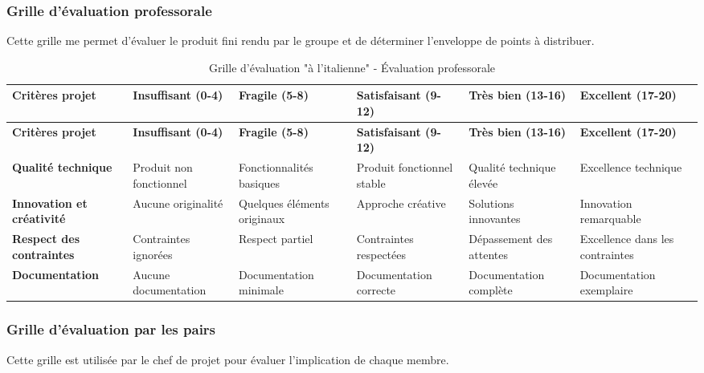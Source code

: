 \subsubsection{Grille d'évaluation professorale}
Cette grille me permet d'évaluer le produit fini rendu par le groupe et de déterminer l'enveloppe de points à distribuer.

\begin{longtable}{|p{4cm}|p{2cm}|p{2cm}|p{2cm}|p{2cm}|p{2cm}|}
\caption{Grille d'évaluation "à l'italienne" - Évaluation professorale} \\
\hline
\textbf{Critères projet} & \textbf{Insuffisant (0-4)} & \textbf{Fragile (5-8)} & \textbf{Satisfaisant (9-12)} & \textbf{Très bien (13-16)} & \textbf{Excellent (17-20)} \\
\hline
\endfirsthead
\hline
\textbf{Critères projet} & \textbf{Insuffisant (0-4)} & \textbf{Fragile (5-8)} & \textbf{Satisfaisant (9-12)} & \textbf{Très bien (13-16)} & \textbf{Excellent (17-20)} \\
\hline
\endhead
\textbf{Qualité technique} &
Produit non fonctionnel &
Fonctionnalités basiques &
Produit fonctionnel stable &
Qualité technique élevée &
Excellence technique \\
\hline
\textbf{Innovation et créativité} &
Aucune originalité &
Quelques éléments originaux &
Approche créative &
Solutions innovantes &
Innovation remarquable \\
\hline
\textbf{Respect des contraintes} &
Contraintes ignorées &
Respect partiel &
Contraintes respectées &
Dépassement des attentes &
Excellence dans les contraintes \\
\hline
\textbf{Documentation} &
Aucune documentation &
Documentation minimale &
Documentation correcte &
Documentation complète &
Documentation exemplaire \\
\hline
\end{longtable}

\subsubsection{Grille d'évaluation par les pairs}
Cette grille est utilisée par le chef de projet pour évaluer l'implication de chaque membre.

